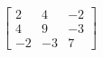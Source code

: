 \documentclass[preview]{standalone}
\begin{document}
\begin{align*}
\begin{bmatrix} 2 & 4 & -2 \\ 4 & 9 & -3 \\ -2 & -3 & 7 \end{bmatrix}
\end{align*}
\end{document}
